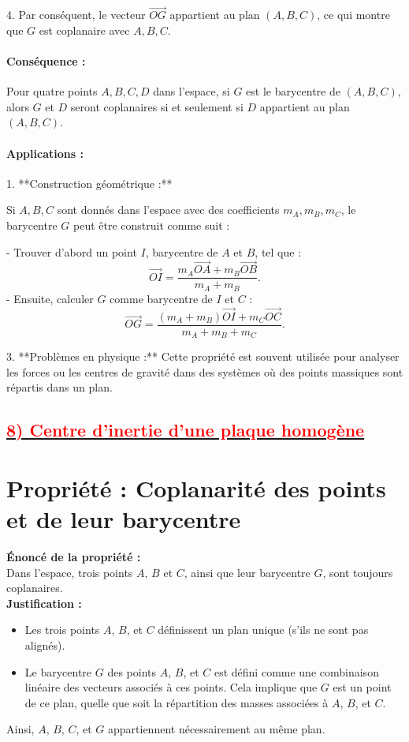 \documentclass{article}
\begin{document}
4. Par conséquent, le vecteur \( \overrightarrow{OG} \) appartient au plan \( (A, B, C) \), ce qui montre que \( G \) est coplanaire avec \( A, B, C \).

\paragraph{Conséquence :}  
Pour quatre points \( A, B, C, D \) dans l’espace, si \( G \) est le barycentre de \( (A, B, C) \), alors \( G \) et \( D \) seront coplanaires si et seulement si \( D \) appartient au plan \( (A, B, C) \).

\paragraph{Applications :}  

1. **Construction géométrique :**  

   Si \( A, B, C \) sont donnés dans l’espace avec des coefficients \( m_A, m_B, m_C \), le barycentre \( G \) peut être construit comme suit :  
   
   - Trouver d’abord un point \( I \), barycentre de \( A \) et \( B \), tel que :  
     \[
     \overrightarrow{OI} = \frac{m_A \overrightarrow{OA} + m_B \overrightarrow{OB}}{m_A + m_B}.
     \]
   - Ensuite, calculer \( G \) comme barycentre de \( I \) et \( C \) :  
     \[
     \overrightarrow{OG} = \frac{(m_A + m_B)\overrightarrow{OI} + m_C \overrightarrow{OC}}{m_A + m_B + m_C}.
     \]

3. **Problèmes en physique :**  
   Cette propriété est souvent utilisée pour analyser les forces ou les centres de gravité dans des systèmes où des points massiques sont répartis dans un plan.


\subsection*{\underline{\textbf{\textcolor{red}{8) Centre d’inertie d’une plaque homogène}}}}
\section*{Propriété : Coplanarité des points et de leur barycentre}

\textbf{Énoncé de la propriété :} \\
Dans l’espace, trois points \( A \), \( B \) et \( C \), ainsi que leur barycentre \( G \), sont toujours coplanaires. \\

\textbf{Justification :}
\begin{itemize}
    \item Les trois points \( A \), \( B \), et \( C \) définissent un plan unique (s'ils ne sont pas alignés).
    \item Le barycentre \( G \) des points \( A \), \( B \), et \( C \) est défini comme une combinaison linéaire des vecteurs associés à ces points. Cela implique que \( G \) est un point de ce plan, quelle que soit la répartition des masses associées à \( A \), \( B \), et \( C \).
\end{itemize}

Ainsi, \( A \), \( B \), \( C \), et \( G \) appartiennent nécessairement au même plan.
		
\end{document}
